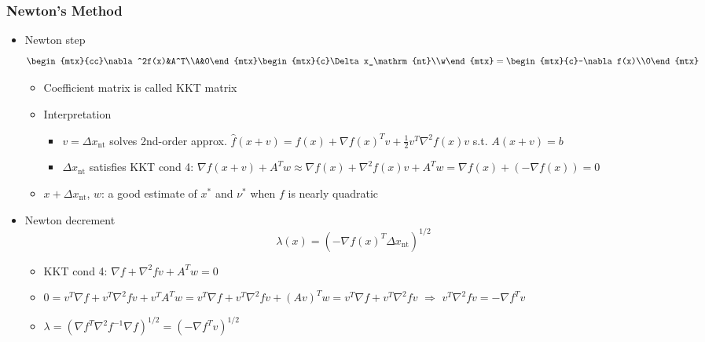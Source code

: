 \subsubsection*{Newton's Method}
\begin{itemize}
    \item Newton step
    \begin{equation}
        \begin{mtx}{cc}\nabla^2f(x)&A^T\\A&0\end{mtx}\begin{mtx}{c}\Delta x_\mathrm{nt}\\w\end{mtx}=\begin{mtx}{c}-\nabla f(x)\\0\end{mtx}
    \end{equation}
    \begin{itemize}
        \item Coefficient matrix is called KKT matrix
        \item Interpretation
        \begin{itemize}
            \item $v=\Delta x_\mathrm{nt}$ solves 2nd-order approx. $\hat{f}(x+v)=f(x)+\nabla f(x)^Tv+\frac{1}{2}v^T\nabla^2 f(x)v$ s.t. $A(x+v)=b$
            \item $\Delta x_\mathrm{nt}$ satisfies KKT cond 4: $\nabla f(x+v)+A^Tw\approx\nabla f(x)+\nabla^2 f(x)v+A^Tw=\nabla f(x)+(-\nabla f(x))=0$
        \end{itemize}
        \item $x+\Delta x_\mathrm{nt}$, $w$: a good estimate of $x^\ast$ and $\nu^\ast$ when $f$ is nearly quadratic
    \end{itemize}
    \item Newton decrement
    \begin{equation}
        \lambda(x)=\left(-\nabla f(x)^T\Delta x_\mathrm{nt}\right)^{1/2}
    \end{equation}
    \begin{itemize}
        \item KKT cond 4: $\nabla f+\nabla^2fv+A^Tw=0$
        \item $0=v^T\nabla f+v^T\nabla^2fv+v^TA^Tw=v^T\nabla f+v^T\nabla^2fv+(Av)^Tw=v^T\nabla f+v^T\nabla^2fv$ $\Rightarrow$ $v^T\nabla^2fv=-\nabla f^Tv$
        \item $\lambda=\left(\nabla f^T\nabla^2f^{-1}\nabla f\right)^{1/2}=\left(-\nabla f^Tv\right)^{1/2}$

\end{itemize}
\end{itemize}
